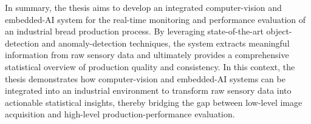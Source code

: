 In summary, the thesis aims to develop an integrated computer-vision and embedded-AI system for the real-time monitoring and performance evaluation of an industrial bread production process. By leveraging state-of-the-art object-detection and anomaly-detection techniques, the system extracts meaningful information from raw sensory data and ultimately provides a comprehensive statistical overview of production quality and consistency.
In this context, the thesis demonstrates how computer-vision and embedded-AI systems can be integrated into an industrial environment to transform raw sensory data into actionable statistical insights, thereby bridging the gap between low-level image acquisition and high-level production-performance evaluation.
